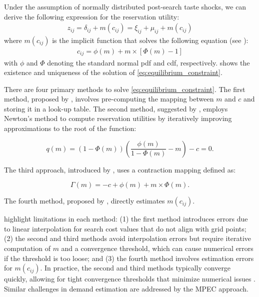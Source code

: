 \documentclass[12pt]{article}
\begin{document}
Under the assumption of normally distributed post-search taste shocks, we can derive the following
expression for the reservation utility:
\begin{align}
    z_{i j}=\delta_{i j}+m\left(c_{i j}\right)=\xi_{i j}+\mu_{i j}+m\left(c_{i j}\right) \nonumber
\end{align}
where \(m\left(c_{i j} \right)\) is the implicit function that solves the following equation (see \cite{kim2010online}):
\begin{align}
    c_{i j}=\phi(m)+m \times[\Phi(m)-1] \label{eq:equilibrium_constraint}
\end{align}
with \(\phi\) and \(\Phi\) denoting the standard normal pdf and cdf, respectively. \cite{weitzman1979optimal} shows the existence and uniqueness of the solution of \eqref{eq:equilibrium_constraint}.


There are four primary methods to solve \eqref{eq:equilibrium_constraint}. The first method, proposed by \cite{kim2010online}, involves pre-computing the mapping between \( m \) and \( c \) and storing it in a look-up table. The second method, suggested by \cite{jiang2021consumer}, employs Newton's method to compute reservation utilities by iteratively improving approximations to the root of the function:

\[
    q(m) = (1-\Phi(m))\left(\frac{\phi(m)}{1-\Phi(m)} - m\right) - c = 0.
\]

The third approach, introduced by \cite{elberg2019dynamic}, uses a contraction mapping defined as:

\[
    \Gamma(m) = -c + \phi(m) + m \times \Phi(m).
\]

The fourth method, proposed by \cite{morozov2023measuring}, directly estimates \( m(c_{ij}) \).

\cite{ursu2023sequential} highlight limitations in each method: (1) the first method introduces errors due to linear interpolation for search cost values that do not align with grid points; (2) the second and third methods avoid interpolation errors but require iterative computation of \( m \) and a convergence threshold, which can cause numerical errors if the threshold is too loose; and (3) the fourth method involves estimation errors for \( m(c_{ij}) \). In practice, the second and third methods typically converge quickly, allowing for tight convergence thresholds that minimize numerical issues \citep{ursu2023sequential}. Similar challenges in demand estimation are addressed by the MPEC approach.
\end{document}
